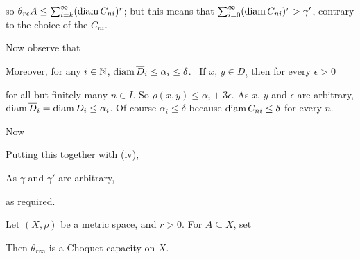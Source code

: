 {\noindent so
$\theta_{r\epsilon}\tilde A\le\sum_{i=k}^{\infty}(\mathop{\text{diam}} C_{ni})^r$;
but this means that $\sum_{i=0}^{\infty}(\mathop{\text{diam}} C_{ni})^r>\gamma'$,
contrary to the choice of the $C_{ni}$.\ \Bang\Qed

\medskip

 Now observe that


\noindent Moreover, for any $i\in\Bbb N$,
$\mathop{\text{diam}}\overline{D}_i\le\alpha_i\le\delta$.   \Prf\ If $x$, $y\in D_i$
then for every $\epsilon>0$


\noindent for all but finitely many $n\in I$.   So
$\rho(x,y)\le\alpha_i+3\epsilon$.   As $x$, $y$ and $\epsilon$ are
arbitrary, $\mathop{\text{diam}}\overline{D}_i=\mathop{\text{diam}} D_i\le\alpha_i$.   Of course
$\alpha_i\le\delta$ because $\mathop{\text{diam}} C_{ni}\le\delta$ for every $n$.\ \Qed

Now


\noindent Putting this together with (iv),


\noindent As $\gamma$ and $\gamma'$ are arbitrary,


\noindent as required.
}%

 Let $(X,\rho)$ be a metric space, and $r>0$.
For $A\subseteq X$, set


\noindent Then $\theta_{r\infty}$ is a Choquet capacity on $X$.

